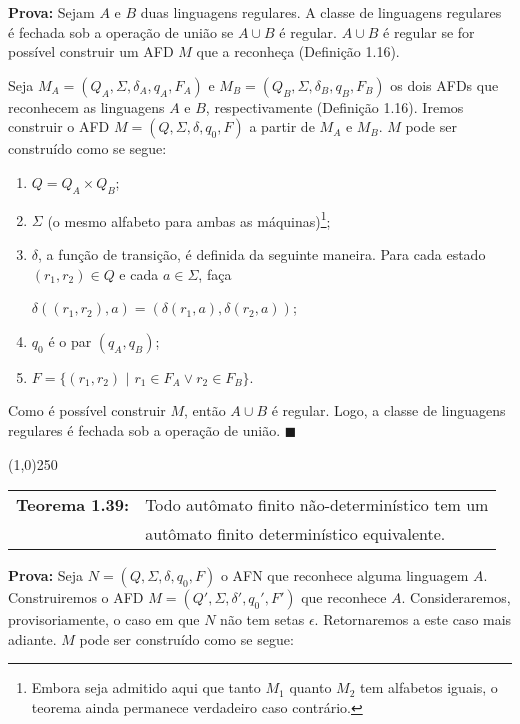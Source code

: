 \documentclass[12pt,a4paper,oneside]{article}
\begin{document}
{\bf Prova:} Sejam $A$ e $B$ duas linguagens regulares. A classe de linguagens regulares é fechada sob a operação de união se $A \cup B$ é regular. $A \cup B$ é regular se for possível construir um AFD $M$ que a reconheça (Definição 1.16).

Seja $M_A = ( Q_A, \Sigma, \delta_A, q_A, F_A )$ e $M_B = ( Q_B, \Sigma, \delta_B, q_B, F_B )$ os dois AFDs que reconhecem as linguagens $A$ e $B$, respectivamente (Definição 1.16). Iremos construir o AFD $M = ( Q, \Sigma, \delta, q_0, F )$ a partir de $M_A$ e $M_B$. $M$ pode ser construído como se segue:

\begin{enumerate}
	\item $Q = Q_A \times Q_B$;
	\item $\Sigma$ (o mesmo alfabeto para ambas as máquinas)\footnote{Embora seja admitido aqui que tanto $M_1$ quanto $M_2$ tem alfabetos iguais, o teorema ainda permanece verdadeiro caso contrário.};
	\item $\delta$, a função de transição, é definida da seguinte maneira. Para cada estado $(r_1,r_2) \in Q$ e cada $a \in \Sigma$, faça
		\begin{center}
			$\delta( (r_1, r_2), a ) = (\delta(r_1,a), \delta(r_2,a)) $;
		\end{center}
	\item $q_0$ é o par $(q_A, q_B)$;
	\item $F = \{ (r_1, r_2) \mbox{ | } r_1 \in F_A \vee r_2 \in F_B \}$.
\end{enumerate}

Como é possível construir $M$, então $A \cup B$ é regular. Logo, a classe de linguagens regulares é fechada sob a operação de união. $\blacksquare$

\begin{center}
\line(1,0){250}
\end{center}

\begin{flushleft}
	\begin{tabular}{ll}
		{\bf Teorema 1.39:} & Todo autômato finito não-determinístico tem um \\
							& autômato finito determinístico equivalente.
	\end{tabular}
\end{flushleft}

{\bf Prova:} Seja $N = (Q, \Sigma, \delta, q_0, F)$ o AFN que reconhece alguma linguagem $A$. Construiremos o AFD $M = (Q', \Sigma, \delta', q_0', F' )$ que reconhece $A$. Consideraremos, provisoriamente, o caso em que $N$ não tem setas $\epsilon$. Retornaremos a este caso mais adiante. $M$ pode ser construído como se segue:
\end{document}
